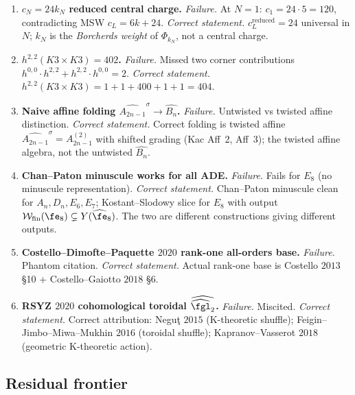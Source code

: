 \begin{theorem}
\begin{enumerate}
\item \textbf{$c_N = 24 k_N$ reduced central charge.}
\emph{Failure.} At $N = 1$: $c_1 = 24 \cdot 5 = 120$, contradicting
MSW $c_L = 6k + 24$.
\emph{Correct statement.} $c_L^{\mathrm{reduced}} = 24$ universal in $N$; $k_N$
is the \emph{Borcherds weight} of $\Phi_{k_N}$, not a central charge.

\item \textbf{$h^{2,2}(K3 \times K3) = 402$.}
\emph{Failure.} Missed two corner contributions $h^{0,0}\cdot h^{2,2}
+ h^{2,2}\cdot h^{0,0} = 2$.
\emph{Correct statement.} $h^{2,2}(K3\times K3) = 1 + 1 + 400 + 1 + 1 = 404$.

\item \textbf{Naive affine folding $\widehat{A_{2n-1}}^\sigma
\to \widehat{B_n}$.}
\emph{Failure.} Untwisted vs twisted affine distinction.
\emph{Correct statement.} Correct folding is twisted affine
$\widehat{A_{2n-1}}^\sigma = A_{2n-1}^{(2)}$ with shifted grading
(Kac Aff~2, Aff~3); the twisted affine algebra, not the untwisted
$\widehat{B_n}$.

\item \textbf{Chan--Paton minuscule works for all ADE.}
\emph{Failure.} Fails for $E_8$ (no minuscule representation).
\emph{Correct statement.} Chan--Paton minuscule clean for $A_n, D_n, E_6, E_7$;
Kostant--Slodowy slice for $E_8$ with output
$\cW_{\mathrm{fin}}(\fe_8) \subsetneq Y(\widehat{\fe}_8)$. The two
are different constructions giving different outputs.

\item \textbf{Costello--Dimofte--Paquette $2020$ rank-one
all-orders base.}
\emph{Failure.} Phantom citation.
\emph{Correct statement.} Actual rank-one base is Costello $2013$ \S 10 +
Costello--Gaiotto $2018$ \S 6.

\item \textbf{RSYZ $2020$ cohomological toroidal
$\widehat{\widehat{\fgl}_2}$.}
\emph{Failure.} Miscited.
\emph{Correct statement.} Correct attribution: Negu\c t $2015$ (K-theoretic
shuffle); Feigin--Jimbo--Miwa--Mukhin $2016$ (toroidal shuffle);
Kapranov--Vasserot $2018$ (geometric K-theoretic action).
\end{enumerate}
\end{theorem}

\subsection{Residual frontier}
\label{wn:subsec:spine-frontier}

